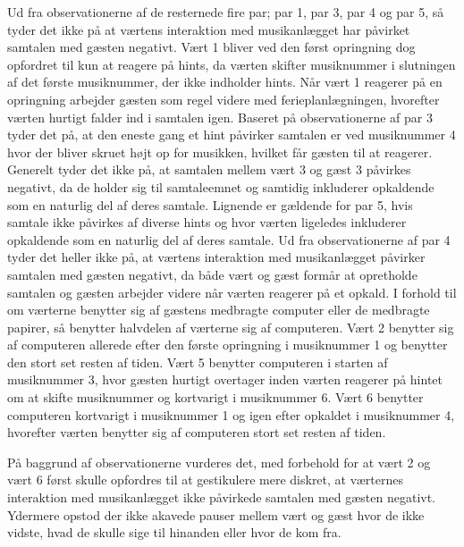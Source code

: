 Ud fra observationerne af de resternede fire par; par 1, par 3, par 4 og par 5, så tyder det ikke på at værtens interaktion med musikanlægget har påvirket samtalen med gæsten negativt. Vært 1 bliver ved den først opringning dog opfordret til kun at reagere på hints, da værten skifter musiknummer i slutningen af det første musiknummer, der ikke indholder hints. Når vært 1 reagerer på en opringning arbejder gæsten som regel videre med ferieplanlægningen, hvorefter værten hurtigt falder ind i samtalen igen. Baseret på observationerne af par 3 tyder det på, at den eneste gang et hint påvirker samtalen er ved musiknummer 4 hvor der bliver skruet højt op for musikken, hvilket får gæsten til at reagerer. Generelt tyder det ikke på, at samtalen mellem vært 3 og gæst 3 påvirkes negativt, da de holder sig til samtaleemnet og samtidig inkluderer opkaldende som en naturlig del af deres samtale. Lignende er gældende for par 5, hvis samtale ikke påvirkes af diverse hints og hvor værten ligeledes inkluderer opkaldende som en naturlig del af deres samtale. Ud fra observationerne af par 4 tyder det heller ikke på, at værtens interaktion med musikanlægget påvirker samtalen med gæsten negativt, da både vært og gæst formår at opretholde samtalen og gæsten arbejder videre når værten reagerer på et opkald. \blankline
%
I forhold til om værterne benytter sig af gæstens medbragte computer eller de medbragte papirer, så benytter halvdelen af værterne sig af computeren. Vært 2 benytter sig af computeren allerede efter den første opringning i musiknummer 1 og benytter den stort set resten af tiden. Vært 5 benytter computeren i starten af musiknummer 3, hvor gæsten hurtigt overtager inden værten reagerer på hintet om at skifte musiknummer og kortvarigt i musiknummer 6. Vært 6 benytter computeren kortvarigt i musiknummer 1 og igen efter opkaldet i musiknummer 4, hvorefter værten benytter sig af computeren stort set resten af tiden. 

På baggrund af observationerne vurderes det, med forbehold for at vært 2 og vært 6 først skulle opfordres til at gestikulere mere diskret, at værternes interaktion med musikanlægget ikke påvirkede samtalen med gæsten negativt. Ydermere opstod der ikke akavede pauser mellem vært og gæst hvor de ikke vidste, hvad de skulle sige til hinanden eller hvor de kom fra. 

